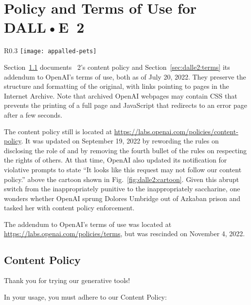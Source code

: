
\section{Policy and Terms of Use for DALL•E~2}
\label{sec:dalle2:sources}

\begin{wrapfigure}[9]{R}{0.3\textwidth}
\centering
\texttt{[image: appalled-pets]}
\caption{Be nice to \DALLE's pets!}\label{fig:dalle2:cartoon}
\end{wrapfigure}

Section~\ref{sec:dalle2:contentpolicy} documents \DALLE~2's content policy and
Section~\ref{sec:dalle2:terms} its addendum to OpenAI's terms of use, both as of
July 20, 2022. They preserve the structure and formatting of the original, with
links pointing to pages in the Internet Archive. Note that archived OpenAI
webpages may contain CSS that prevents the printing of a full page and
JavaScript that redirects to an error page after a few seconds.

The content policy still is located at
\url{https://labs.openai.com/policies/content-policy}. It was updated on
September 19, 2022 by rewording the rules on disclosing the role of \AI{} and by
removing the fourth bullet of the rules on respecting the rights of others. At
that time, OpenAI also updated its notification for violative prompts to state
``It looks like this request may not follow our content policy.'' above the
cartoon shown in Fig.~\ref{fig:dalle2:cartoon}. Given this abrupt switch from
the inappropriately punitive to the inappropriately saccharine, one wonders
whether OpenAI sprung Dolores Umbridge out of Azkaban prison and tasked her with
content policy enforcement.

The addendum to OpenAI's terms of use was located at
\url{https://labs.openai.com/policies/terms}, but was rescinded on November 4,
2022.


\subsection{Content Policy}
\label{sec:dalle2:contentpolicy}

Thank you for trying our generative \AI{} tools!

\noindent In your usage, you must adhere to our Content Policy:

